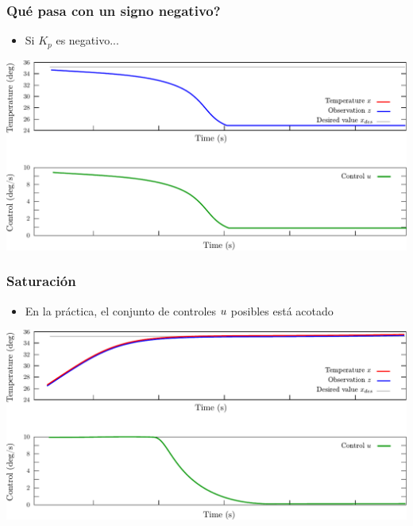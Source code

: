 \begin{frame}
    \frametitle{Qué pasa con un signo negativo?}
    
    \begin{itemize}
        \item Si $K_{p}$ es negativo...
    \end{itemize}
    
    \begin{center}
        \includegraphics[width=0.8\columnwidth]{images/pid_control_proportional_wrong_sign.pdf}
    \end{center}
    
\end{frame}

\begin{frame}
    \frametitle{Saturación}
    
    \begin{itemize}
        \item En la práctica, el conjunto de controles $u$ posibles está acotado
    \end{itemize}
    
    \begin{center}
        \includegraphics[width=0.8\columnwidth]{images/pid_control_proportional_saturation.pdf}
    \end{center}
    
\end{frame}


